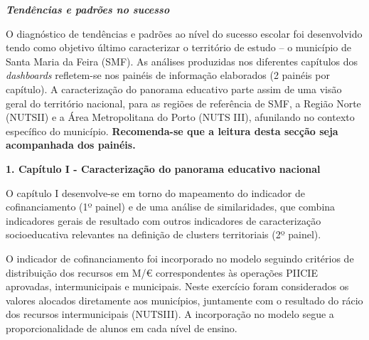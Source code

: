 \documentclass[
]{book}
\begin{document}
\textbf{\emph{Tendências e padrões no sucesso}}

O diagnóstico de tendências e padrões ao nível do sucesso escolar foi desenvolvido tendo como objetivo último caracterizar o território de estudo -- o município de Santa Maria da Feira (SMF). As análises produzidas nos diferentes capítulos dos \emph{dashboards} refletem-se nos painéis de informação elaborados (2 painéis por capítulo). A caracterização do panorama educativo parte assim de uma visão geral do território nacional, para as regiões de referência de SMF, a Região Norte (NUTSII) e a Área Metropolitana do Porto (NUTS III), afunilando no contexto específico do município. \textbf{Recomenda-se que a leitura desta secção seja acompanhada dos painéis.}

\textbf{1. Capítulo I - Caracterização do panorama educativo nacional}

O capítulo I desenvolve-se em torno do mapeamento do indicador de cofinanciamento (1º painel) e de uma análise de similaridades, que combina indicadores gerais de resultado com outros indicadores de caracterização socioeducativa relevantes na definição de clusters territoriais (2º painel).

O indicador de cofinanciamento foi incorporado no modelo seguindo critérios de distribuição dos recursos em M/€ correspondentes às operações PIICIE aprovadas, intermunicipais e municipais. Neste exercício foram considerados os valores alocados diretamente aos municípios, juntamente com o resultado do rácio dos recursos intermunicipais (NUTSIII). A incorporação no modelo segue a proporcionalidade de alunos em cada nível de ensino.
\end{document}
